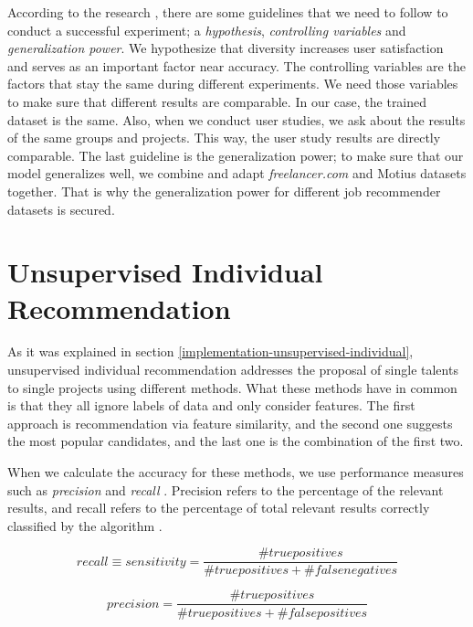 According to the research \cite{shani2011evaluating}, there are some guidelines that we need to follow to conduct a successful experiment; a \textit{hypothesis}, \textit{controlling variables} and \textit{generalization power}. We hypothesize that diversity increases user satisfaction and serves as an important factor near accuracy. The controlling variables are the factors that stay the same during different experiments. We need those variables to make sure that different results are comparable. In our case, the trained dataset is the same. Also, when we conduct user studies, we ask about the results of the same groups and projects. This way, the user study results are directly comparable. The last guideline is the generalization power; to make sure that our model generalizes well, we combine and adapt \textit{freelancer.com} and Motius datasets together. That is why the generalization power for different job recommender datasets is secured. 


\section{Unsupervised Individual Recommendation}

As it was explained in section \ref{implementation-unsupervised-individual}, unsupervised individual recommendation addresses the proposal of single talents to single projects using different methods. What these methods have in common is that they all ignore labels of data and only consider features. The first approach is recommendation via feature similarity, and the second one suggests the most popular candidates, and the last one is the combination of the first two.

When we calculate the accuracy for these methods, we use performance measures such as \textit{precision} and \textit{recall} \cite{burke2015robust}. Precision refers to the percentage of the relevant results, and recall refers to the percentage of total relevant results correctly classified by the algorithm \cite{davis2006relationship}.

\begin{equation}
recall \equiv  sensitivity =\frac{\#  true positives }{\# true positives +\# false negatives }
\end{equation}

\begin{equation}
precision =\frac{\#true positives }{\# true positives +\#  false positives }
\end{equation}

